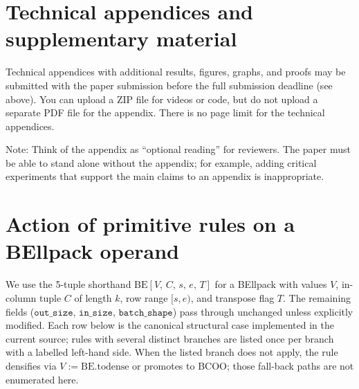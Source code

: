 \documentclass{article}
\begin{document}





\appendix

\section{Technical appendices and supplementary material}
Technical appendices with additional results, figures, graphs, and proofs may be submitted with the paper submission before the full submission deadline (see above). You can upload a ZIP file for videos or code, but do not upload a separate PDF file for the appendix. There is no page limit for the technical appendices.

Note: Think of the appendix as ``optional reading'' for reviewers. The paper must be able to stand alone without the appendix; for example, adding critical experiments that support the main claims to an appendix is inappropriate.

\section{Action of primitive rules on a BEllpack operand}
\label{app:bellpack-rules}

We use the 5-tuple shorthand $\mathrm{BE}[V,\,C,\,s,\,e,\,T]$ for a BEllpack
with values $V$, in-column tuple $C$ of length $k$, row range $[s,e)$, and
transpose flag $T$.  The remaining fields ($\mathtt{out\_size}$,
$\mathtt{in\_size}$, $\mathtt{batch\_shape}$) pass through unchanged unless
explicitly modified.  Each row below is the canonical structural case
implemented in the current source; rules with several distinct branches
are listed once per branch with a labelled left-hand side.  When the
listed branch does not apply, the rule densifies via $V := \mathrm{BE.todense}$
or promotes to BCOO; those fall-back paths are not enumerated here.
\end{document}
